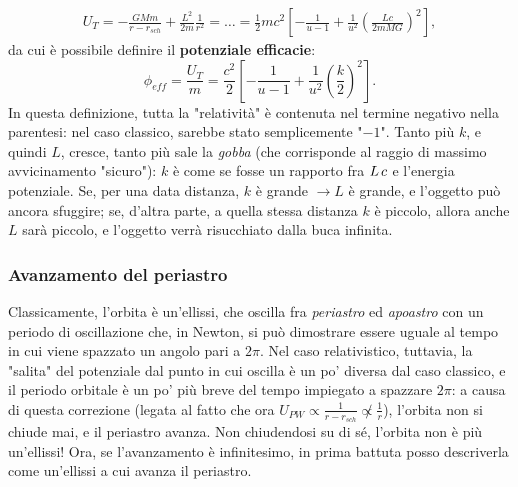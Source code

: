 \begin{align}
    U_T = -\frac{GMm}{r-r_{sch}} + \frac{L^2}{2m}\frac{1}{r^2} = \dots 
    = \frac{1}{2}mc^2\left[ -\frac{1}{u-1} + \frac{1}{u^2}\left(\frac{Lc}{2mMG}\right)^2\right],
\end{align}
da cui è possibile definire il \textbf{potenziale efficacie}:
\begin{equation}
    \phi_{eff} = \frac{U_T}{m} = \frac{c^2}{2}\left[ -\frac{1}{u-1} + \frac{1}{u^2}\left(\frac{k}{2}\right)^2\right].
\end{equation}
In questa definizione, tutta la "relatività" è contenuta nel termine negativo nella parentesi: nel caso classico, sarebbe stato semplicemente "$-1$".
Tanto più $k$, e quindi $L$, cresce, tanto più sale la \textit{gobba} (che corrisponde al raggio di massimo avvicinamento "sicuro"): $k$ è come se fosse un rapporto fra $L\hspace{0.5mm}c$ e l'energia potenziale.
Se, per una data distanza, $k$ è grande $\xrightarrow{} L$ è grande, e l'oggetto può ancora sfuggire; se, d'altra parte, a quella stessa distanza $k$ è piccolo, allora anche $L$ sarà piccolo, e l'oggetto verrà risucchiato dalla buca infinita.

\subsubsection{Avanzamento del periastro}
Classicamente, l'orbita è un'ellissi, che oscilla fra \textit{periastro} ed \textit{apoastro} con un periodo di oscillazione che, in Newton, si può dimostrare essere uguale al tempo in cui viene spazzato un angolo pari a $2\pi$.
Nel caso relativistico, tuttavia, la "salita" del potenziale dal punto in cui oscilla è un po' diversa dal caso classico, e il periodo orbitale è un po' più breve del tempo impiegato a spazzare $2\pi$: a causa di questa correzione (legata al fatto che ora $U_{PW} \propto \frac{1}{r-r_{sch}} \not \propto \frac{1}{r}$), l'orbita non si chiude mai, e il periastro avanza. 
Non chiudendosi su di sé, l'orbita non è più un'ellissi!
Ora, se l'avanzamento è infinitesimo, in prima battuta posso descriverla come un'ellissi a cui avanza il periastro.

